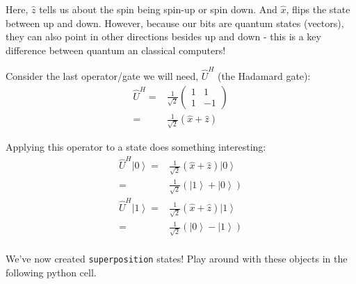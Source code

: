 \documentclass[11pt]{article}
\providecommand{\ket}[1]{\left|#1\right\rangle}
\begin{document}
Here, \(\hat{z}\) tells us about the spin being spin-up or spin down.
And \(\hat{x}\), flips the state between up and down. However, because
our bits are quantum states (vectors), they can also point in other
directions besides up and down - this is a key difference between
quantum an classical computers!

Consider the last operator/gate we will need, \(\hat{U}^H\) (the
Hadamard gate): \[
\begin{align}
\hat{U}^H =& \frac{1}{\sqrt{2}}\begin{pmatrix}1 & 1 \\ 1 &-1\end{pmatrix} \\
    =& \frac{1}{\sqrt{2}}\left(\hat{x}+\hat{z}\right)
\end{align}
\]

Applying this operator to a state does something interesting: \[
\begin{align}
\hat{U}^H\ket{0} =& \frac{1}{\sqrt{2}}\left(\hat{x}+\hat{z}\right)\ket{0} \\
=& \frac{1}{\sqrt{2}}\left(\ket{1} + \ket{0}\right) \\  
\hat{U}^H\ket{1} =& \frac{1}{\sqrt{2}}\left(\hat{x}+\hat{z}\right)\ket{1} \\
=& \frac{1}{\sqrt{2}}\left(\ket{0} - \ket{1}\right) \\  
\end{align}
\]

We've now created \texttt{superposition} states! Play around with these
objects in the following python cell.
\end{document}
